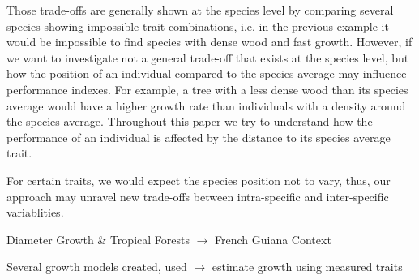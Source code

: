 Those trade-offs are generally shown at the species level by comparing several species showing impossible trait combinations, i.e. in the previous example it would be impossible to find species with dense wood and fast growth. However, if we want to investigate not a general trade-off that exists at the species level, but how the position of an individual compared to the species average may influence performance indexes. For example, a tree with a less dense wood than its species average would have a higher growth rate than individuals with a density around the species average. Throughout this paper we try to understand how the performance of an individual is affected by the distance to its species average trait.

For certain traits, we would expect the species position not to vary, thus, our approach may unravel new trade-offs between intra-specific and inter-specific variablities.

Diameter Growth \& Tropical Forests $\rightarrow$ French Guiana Context

Several growth models created, used $\rightarrow$ estimate growth using measured traits

